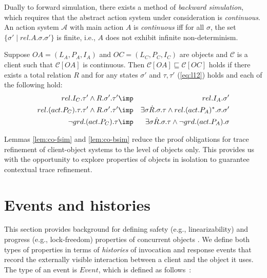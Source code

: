 \documentclass[11pt]{llncs}
\def \sref  {\sqsubseteq}
\newcommand{\msA}{\mathscr{A}}
\newcommand{\mcC}{\mathcal{C}}
\newcommand{\refeq}[1]{(\ref{#1})}
\begin{document}
Dually to forward simulation, there exists a method of \emph{backward
  simulation}, which requires that the abstract action system under
consideration is \emph{continuous}. An action system $\msA$ with main
action $A$ is \emph{continuous} iff for all $\sigma$, the set
$\{\sigma' \mid rel.A.\sigma.\sigma'\}$ is finite, i.e., $A$ does not
exhibit infinite non-determinism.
\begin{lemma}
  \label{lem:co-bsim}
  Suppose $OA = (L_A, P_A, I_A)$ and $OC = (L_C, P_C, I_C)$ are
  objects and $\mcC$ is a client such that $\mcC[OA]$ is
  continuous. Then $\mcC[OA] \sref \mcC[OC]$ holds if there exists a total relation
  $R $ and for any states 
  $\sigma' $ and
  $\tau, \tau' $ \refeq{eq:l12}
  holds and each of the following hold:\vspace{-2mm}
  \begin{eqnarray}
    \label{eq:1}
    rel.I_C.\tau' \land R.\sigma'.\tau' & \imp & rel.I_A.\sigma'
    \\
    \label{eq:2}
    rel.(act.P_C).\tau.\tau' \land R.\sigma'.\tau'  & \imp & \exists 
    \sigma \dot R.\sigma.\tau \land rel.(act.P_A)^*.\sigma.\sigma'
    \\
    \label{eq:13}
    \neg grd.(act.P_C).\tau & \imp & \exists \sigma \dot R.\sigma.\tau \land \neg
    grd.(act.P_A).\sigma
\end{eqnarray}
\end{lemma}
Lemmas \ref{lem:co-fsim} and \ref{lem:co-bsim} reduce the proof
obligations for trace refinement of client-object systems to the level
of objects only. This provides us with the opportunity to explore
properties of objects in isolation to guarantee contextual trace
refinement.

\vspace{-2mm}

\section{Events and histories}


This section provides background for defining safety (e.g.,
linearizability) and progress (e.g., lock-freedom) properties of
concurrent objects \cite{HeSh08}. We define both types of properties
in terms of \emph{histories} of invocation and response events
\cite{Herlihy90,HeSh08} that record the externally visible interaction
between a client and the object it uses. The type of an event is
$Event$, which is defined as follows~\cite{DSW11TOPLAS}:\smallskip
\end{document}
